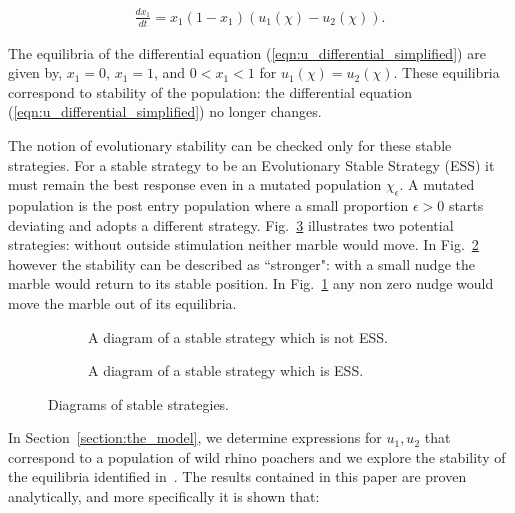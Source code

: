 \documentclass[10pt]{article}
\begin{document}
\begin{eqnarray}
    \label{eqn:u_differential_simplified}
    \frac{dx_1}{dt}= x_1(1 - x_1)(u_1(\chi) - u_2(\chi)).
\end{eqnarray}

The equilibria of the differential equation (\ref{eqn:u_differential_simplified})
are given by, \(x_1=0\), \(x_1=1\), and \(0<x_1<1\) for \(u_1(\chi)=u_2(\chi)\).
These equilibria correspond to stability of the population: the differential 
equation (\ref{eqn:u_differential_simplified}) no longer changes. 

The notion of evolutionary stability can be checked only for these stable strategies.
For a stable strategy to be an Evolutionary Stable Strategy (ESS) it must remain
the best response even in a mutated population \(\chi_\epsilon\). A mutated population
is the post entry population 
where a small proportion \(\epsilon > 0\) starts deviating and adopts a different strategy.
Fig.~\ref{fig:stable_ess_driagrams} illustrates two potential strategies: without
outside stimulation neither marble would move. In Fig.~\ref{fig:ess_diagram}
however the stability can be described as ``stronger": with a small nudge the marble
would return to its stable position. In Fig.~\ref{fig:stable_diagram} any non zero
nudge would move the marble out of its equilibria.

\begin{figure}[!htbp]
\begin{center}
    \begin{subfigure}{0.40\textwidth}
    
    \caption{\label{fig:stable_diagram} A diagram of a stable strategy which 
    is not ESS.}
    \end{subfigure}
    \begin{subfigure}{0.40\textwidth}
    
    \caption{\label{fig:ess_diagram}A diagram of a stable strategy which is ESS.}
    \end{subfigure}
        \caption{\label{fig:stable_ess_driagrams} Diagrams of stable strategies.}
\end{center}
\end{figure}

In Section~\ref{section:the_model}, we determine expressions
for \(u_1, u_2\) that correspond to a population of wild rhino poachers and we
explore the stability of the equilibria identified in~\cite{Lee}. The results
contained in this paper are proven analytically, and more specifically it is 
shown that:
\end{document}
